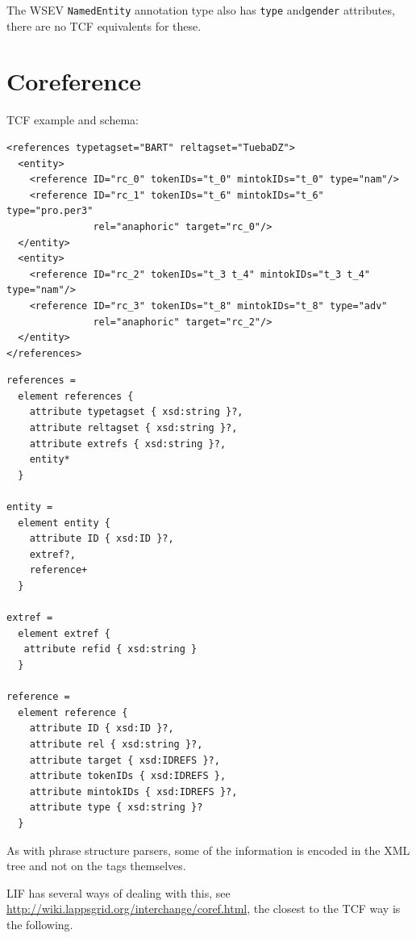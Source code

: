 \documentclass[11pt]{article}
\newcommand{\tag}[1]{{\tt #1}}
\newenvironment{example}
    {\begin{tcolorbox}\small}
    {\end{tcolorbox}}
\begin{document}
The WSEV \tag{NamedEntity} annotation type also has \tag{type} and\tag{gender} attributes, there are no TCF equivalents for these.


\newpage
\section{Coreference}

TCF example and schema:

\begin{example}
\begin{verbatim}
<references typetagset="BART" reltagset="TuebaDZ">
  <entity>
    <reference ID="rc_0" tokenIDs="t_0" mintokIDs="t_0" type="nam"/>
    <reference ID="rc_1" tokenIDs="t_6" mintokIDs="t_6" type="pro.per3" 
               rel="anaphoric" target="rc_0"/>
  </entity>
  <entity>
    <reference ID="rc_2" tokenIDs="t_3 t_4" mintokIDs="t_3 t_4" type="nam"/>
    <reference ID="rc_3" tokenIDs="t_8" mintokIDs="t_8" type="adv" 
               rel="anaphoric" target="rc_2"/>
  </entity>
</references>
\end{verbatim}
\end{example}

\begin{example}
\begin{verbatim}
references =
  element references {
    attribute typetagset { xsd:string }?,
    attribute reltagset { xsd:string }?,
    attribute extrefs { xsd:string }?,
    entity*
  }

entity = 
  element entity {
    attribute ID { xsd:ID }?,
    extref?,
    reference+
  }
  
extref =
  element extref {
   attribute refid { xsd:string }  
  } 

reference =
  element reference {
    attribute ID { xsd:ID }?,
    attribute rel { xsd:string }?,
    attribute target { xsd:IDREFS }?,
    attribute tokenIDs { xsd:IDREFS },
    attribute mintokIDs { xsd:IDREFS }?,
    attribute type { xsd:string }?
  }
\end{verbatim}
\end{example}

As with phrase structure parsers, some of the information is encoded in the XML tree and not on the tags themselves.

LIF has several ways of dealing with this, see {\color{blue}\href{http://wiki.lappsgrid.org/interchange/coref.html}{http://wiki.lappsgrid.org/interchange/coref.html}}, the closest to the TCF way is the following.
\end{document}
